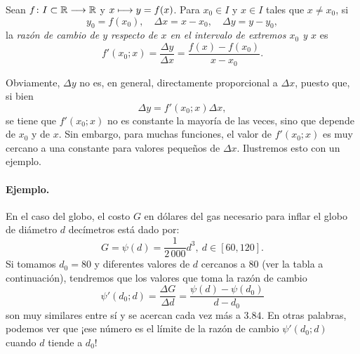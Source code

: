 \begin{defical}
Sean $f\colon I\subset\mathbb{R}\longrightarrow \mathbb{R}$ y $x \longmapsto y = f(x)$. Para $x_0 \in I$ y $x\in
I$ tales que $x\neq x_0$, si
\[
y_0 = f(x_0), \quad \Delta x = x - x_0, \quad \Delta y = y - y_0,
\]
la \emph{razón de cambio de $y$ respecto de $x$ en el intervalo de extremos $x_0$ y $x$} es
\begin{equation}
\label{eq:dm011}
f'(x_0;x) = \frac{\Delta y}{\Delta x} = \frac{f(x) - f(x_0)}{x - x_0}.
\end{equation}
\end{defical}

Obviamente, $\Delta y$ no es, en general, directamente proporcional a $\Delta x$, puesto que, si bien
\begin{equation}
\label{eq:dm012}
\Delta y = f'(x_0;x)\Delta x,
\end{equation}
se tiene que $f'(x_0;x)$ no es constante la mayoría de las veces, sino que depende de $x_0$ y de $x$. Sin
embargo, para muchas funciones, el valor de $f'(x_0;x)$ es muy cercano a una constante para valores
pequeños de $\Delta x$. Ilustremos esto con un ejemplo.

\paragraph{Ejemplo.}
En el caso del globo, el costo $G$ en dólares del gas necesario para inflar el globo de diámetro
$d$ decímetros está dado por:
\[
G = \psi(d) = \frac{1}{2\,000}d^{3},\ d\in [60,120].
\]
Si tomamos $d_{0}=80$ y diferentes valores de $d$ cercanos a 80 (ver la tabla a continuación),
tendremos que los valores que toma la razón de cambio
\[
\psi'(d_{0};d) = \frac{\Delta G}{\Delta d} = \frac{\psi(d)-\psi(d_{0})}{d-d_{0}}
\]
son muy similares entre sí y se acercan cada vez más a $3.84$. En otras palabras, podemos ver que
¡ese número es el límite de la razón de cambio $\psi'(d_{0};d)$ cuando $d$ tiende a $d_0$!

